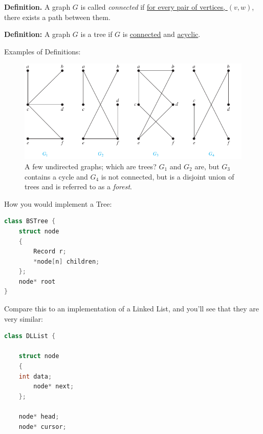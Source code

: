\documentclass[a4paper,10pt]{report}
\begin{document}
\textbf{Definition.} A graph $G$ is called \textit{connected} if \underline{for every pair of vertices, $(v,w)$}, there exists a path between them.

\textbf{Definition:}  A graph $G$ is a tree if $G$ is \underline{connected} and \underline{acyclic}.

\hrulefill

Examples of Definitions:
\begin{figure}[H]
	\begin{centering}
	\begin{center}
	\includegraphics[width=\linewidth]{./some_trees.png}
	\caption{A few undirected graphs; which are trees? $G_1$ and $G_2$ are, but $G_3$ contains a cycle and $G_4$ is not connected, but is a disjoint union of trees and is referred to as a \textit{forest}.}
	\label{fig:some_trees}
	\end{center}
	\par\end{centering}
\end{figure}

\newpage
How you would implement a Tree:
\begin{lstlisting}[language=C++]
class BSTree {
    struct node
    {
        Record r;
        *node[n] children;
    };
	node* root
}
\end{lstlisting}

Compare this to an implementation of a Linked List, and you'll see that they are very similar:
\begin{lstlisting}[language=C++]
class DLList {

    struct node
    {
	int data;
        node* next;
    };

    node* head;
    node* cursor;
\end{lstlisting}
\end{document}
